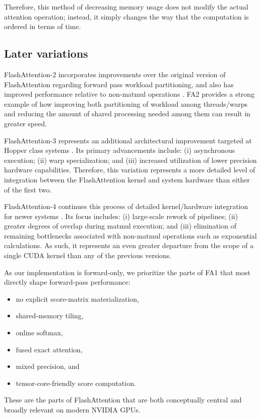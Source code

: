 \documentclass{article}
\begin{document}
Therefore, this method of decreasing memory usage does not modify the actual attention operation; instead, it simply changes the way that the computation is ordered in terms of time.

\subsection{Later variations}

FlashAttention-2 incorporates improvements over the original version of FlashAttention regarding forward pass workload partitioning, and also has improved performance relative to non-matmul operations \citep{dao2023flashattention2}. FA2 provides a strong example of how improving both partitioning of workload among threads/warps and reducing the amount of shared processing needed among them can result in greater speed.

FlashAttention-3 represents an additional architectural improvement targeted at Hopper class systems \citep{shah2024flashattention3}. Its primary advancements include: (i) asynchronous execution; (ii) warp specialization; and (iii) increased utilization of lower precision hardware capabilities. Therefore, this variation represents a more detailed level of integration between the FlashAttention kernel and system hardware than either of the first two.

FlashAttention-4 continues this process of detailed kernel/hardware integration for newer systems \citep{zadouri2026flashattention4}. Its focus includes: (i) large-scale rework of pipelines; (ii) greater degrees of overlap during matmul execution; and (iii) elimination of remaining bottlenecks associated with non-matmul operations such as exponential calculations. As such, it represents an even greater departure from the scope of a single CUDA kernel than any of the previous versions.

As our implementation is forward-only, we prioritize the parts of FA1 that most directly shape forward-pass performance:
\begin{itemize}
    \item no explicit score-matrix materialization,
    \item shared-memory tiling,
    \item online softmax,
    \item fused exact attention,
    \item mixed precision, and
    \item tensor-core-friendly score computation.
\end{itemize}
These are the parts of FlashAttention that are both conceptually central and broadly relevant on modern NVIDIA GPUs.
\end{document}
